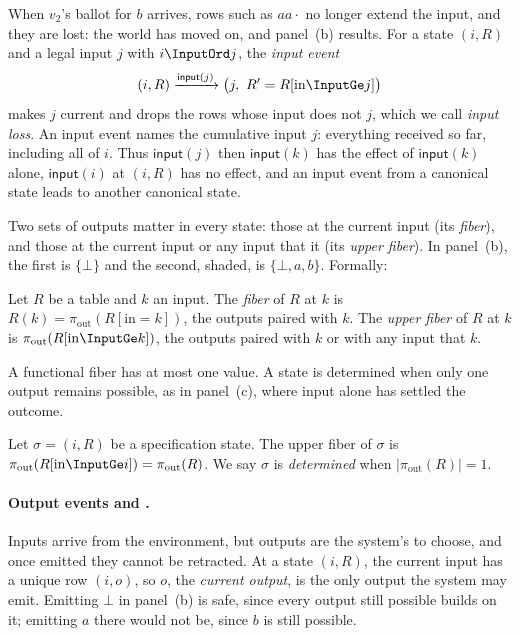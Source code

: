 When $v_2$'s ballot for $b$ arrives, rows such as $aa\cdot$ no longer extend
the input, and they are lost: the world has moved on, and panel~(b) results.
For a state $(i,R)$ and a legal input $j$ with $i\InputOrd j$, the \emph{input
event}
\begin{equation}
  (i,R)\xrightarrow{\mathsf{input}(j)}
  \bigl(j,\ R' = R[\mathrm{in}\InputGe j]\bigr)
  \label{eq:input-event}
\end{equation}
makes $j$ current and drops the rows whose input does not \inrelbase $j$,
which we call \emph{input loss}.  An input event names the cumulative input
$j$: everything received so far, including all of $i$.  Thus
$\mathsf{input}(j)$ then $\mathsf{input}(k)$ has the effect of
$\mathsf{input}(k)$ alone, $\mathsf{input}(i)$ at $(i,R)$ has no effect, and an
input event from a canonical state leads to another canonical state.

Two sets of outputs matter in every state: those at the current
input (its \emph{fiber}), and those at the current input or any input that
\inrel it (its \emph{upper fiber}).  In panel~(b), the
first is $\{\bot\}$ and the second, shaded, is $\{\bot,a,b\}$.  Formally:

\begin{definition}
\label{def:fiber}
Let $R$ be a table and $k$ an input.  The \emph{fiber} of $R$ at $k$ is
$R(k)=\pi_{\mathrm{out}}(R[\mathrm{in}=k])$, the outputs paired with $k$.  The
\emph{upper fiber} of $R$ at $k$ is $\pi_{\mathrm{out}}(R[\mathrm{in}\InputGe
k])$, the outputs paired with $k$ or with any input that \inrel $k$.
\end{definition}

A functional fiber has at most one value.  A state is determined when only one
output remains possible, as in panel~(c), where input alone has settled the
outcome.

\begin{definition}
\label{def:determined}
Let $\sigma = (i, R)$ be a specification state.  The upper fiber of $\sigma$
is $\pi_{\mathrm{out}}(R[\mathrm{in}\InputGe i]) = \pi_{\mathrm{out}}(R)$.
We say $\sigma$ is \emph{determined} when $|\pi_{\mathrm{out}}(R)|=1$.
\end{definition}

\paragraph{Output events and \commitments.}
Inputs arrive from the environment, but outputs are the system's to choose, and
once emitted they cannot be retracted.  At a state $(i,R)$, the current input
has a unique row $(i,o)$, so $o$, the \emph{current output}, is the only output
the system may emit.  Emitting $\bot$ in panel~(b) is safe, since every output
still possible builds on it; emitting $a$ there would not be, since $b$ is
still possible.

